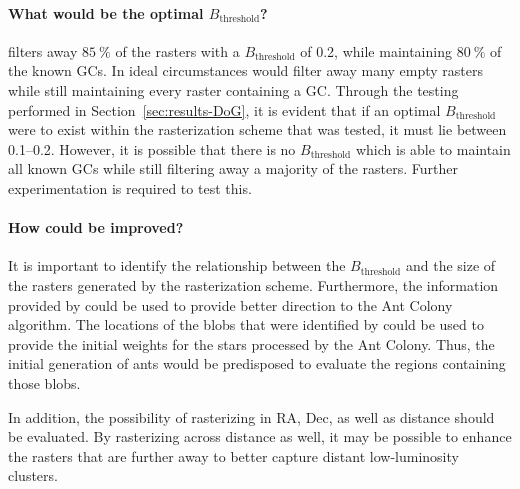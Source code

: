 \paragraph{What would be the optimal $B_{\text{threshold}}$?}\paragraphnewline{}
\blobdog{} filters away $\SI{85}{\percent}$ of the rasters with a
$B_{\text{threshold}}$ of 0.2, while maintaining $\SI{80}{\percent}$ of the
known GCs. In ideal circumstances \blobdog{} would filter away many empty
rasters while still maintaining every raster containing a GC. Through the
testing performed in Section~\ref{sec:results-DoG}, it is evident that if an
optimal $B_{\text{threshold}}$ were to exist within the rasterization scheme
that was tested, it must lie between \SIrange{0.1}{0.2}{}. However, it is
possible that there is no $B_{\text{threshold}}$ which is able to maintain all
known GCs while still filtering away a majority of the rasters. Further
experimentation is required to test this.

\paragraph{How could \blobdog{} be improved?}\paragraphnewline{}
It is important to identify the relationship between the $B_{\text{threshold}}$
and the size of the rasters generated by the rasterization scheme. Furthermore,
the information provided by \blobdog{} could be used to provide better direction
to the Ant Colony algorithm. The locations of the blobs that were identified by
\blobdog{} could be used to provide the initial weights for the stars processed
by the Ant Colony. Thus, the initial generation of ants would be predisposed to
evaluate the regions containing those blobs.

In addition, the possibility of rasterizing in RA, Dec, as well as distance
should be evaluated. By rasterizing across distance as well, it may be possible
to enhance the rasters that are further away to better capture distant
low-luminosity clusters.

